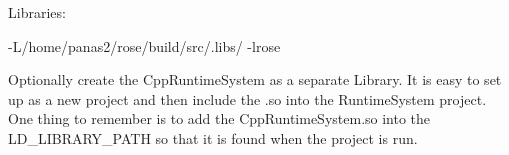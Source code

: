 Libraries:

 -L/home/panas2/rose/build/src/.libs/ -lrose

Optionally create the CppRuntimeSystem as a separate Library. It is easy to set up as a new project and then include the .so into the RuntimeSystem project. One thing to remember is to add the CppRuntimeSystem.so into the LD\_LIBRARY\_PATH so that it is found when the project is run.


